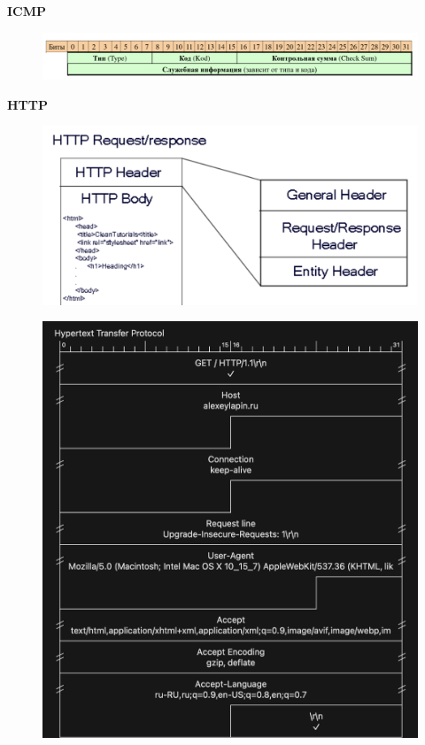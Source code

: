\documentclass[12pt,onecolumn]{article}
\begin{document}
\textbf{ICMP}
\begin{figure}[H]
    \centering
    \includegraphics*[width=\textwidth]{image/part10/icmp.png}
\end{figure}
\textbf{HTTP}
\begin{figure}[H]
    \centering
    \includegraphics*[width=\textwidth]{image/part10/http.png}
\end{figure}
\begin{figure}[H]
    \centering
    \includegraphics*[width=\textwidth]{image/part10/http2.png}
\end{figure}
\end{document}
